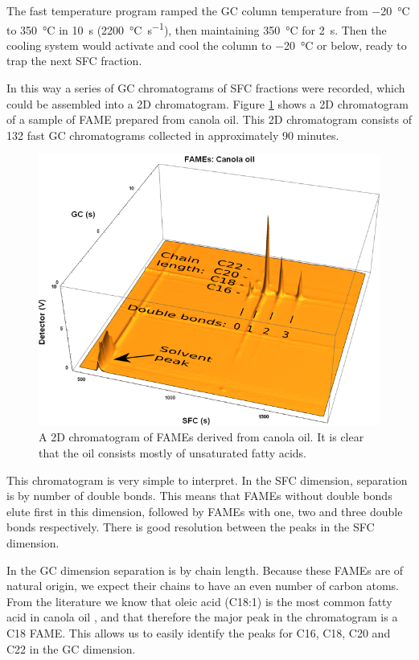 The fast temperature program ramped the GC column temperature from
\SI{-20}{\celsius} to \SI{350}{\celsius} in \SI{10}{s}
(\SI{2200}{\celsius\per\second}), then maintaining \SI{350}{\celsius} for
\SI{2}{\second}. Then the cooling system would activate and cool the column to
\SI{-20}{\celsius} or below, ready to trap the next SFC fraction.

In this way a series of GC chromatograms of SFC fractions were recorded, which
could be assembled into a 2D chromatogram. Figure \ref{fig:2DCanola} shows
a 2D chromatogram of a sample of FAME prepared from canola oil. This 2D
chromatogram consists of 132 fast GC chromatograms collected in approximately 90
minutes.


\begin{figure}
\centering
\includegraphics[width=\textwidth]{Figures/Interpretation.png}
\decoRule

\caption[SFC×GC of canola oil]{A 2D chromatogram of FAMEs derived from
canola oil. It is clear that the oil consists mostly of unsaturated fatty
acids.}

\label{fig:2DCanola}
\end{figure}

This chromatogram is very simple to interpret. In the SFC dimension, separation
is by number of double bonds. This means that FAMEs without double bonds elute
first in this dimension, followed by FAMEs with one, two and three double bonds
respectively. There is good resolution between the peaks in the SFC dimension. 

In the GC dimension separation is by chain length. Because these FAMEs are of
natural origin, we expect their chains to have an even number of carbon atoms.
From the literature we know that oleic acid (C18:1) is the most common fatty
acid in canola oil \autocite{JFAOWHOCAC2019}, and that therefore the major peak
in the chromatogram is a C18 FAME. This allows us to easily identify the peaks
for C16, C18, C20 and C22 in the GC dimension.

